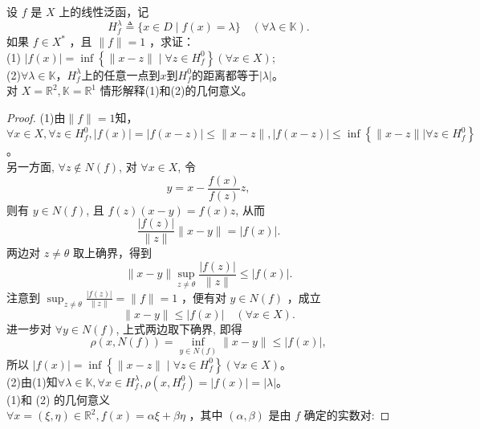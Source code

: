 \documentclass[lang=cn,newtx,10pt,scheme=chinese,thmcnt=chapter]{elegantbook}
\begin{document}
\begin{problem}
 设 $f$ 是 ${X}$ 上的线性泛函，记
\begin{equation*}
H_f^\lambda \triangleq\{x \in D \mid f(x)=\lambda\} \quad(\forall \lambda \in \mathbb{K} ) .
\end{equation*}
如果 $f \in {X}^*$ ，且 $\|f\|=1$ ，求证：\\
(1) $|f(x)|=\inf \left\{\|x-z\| \mid \forall z \in H_f^0\right\}(\forall x \in {X} )$;\\
(2)$\forall \lambda \in \mathbb{K}$，$H_f^\lambda$上的任意一点到$x$到$H_f^0$的距离都等于$|\lambda|$。\\
对 ${X} = \mathbb{R} ^2, \mathbb{K} = \mathbb{R} ^1$ 情形解释(1)和(2)的几何意义。
\end{problem}
\begin{proof}
    (1)由$\|f\|=1$知，$\forall x\in {X},\forall z\in H_f^0,|f(x)|=|f(x-z)|\leqslant \|x-z\|,|f(x-z)|\leqslant\inf \left\{\|x-z\| |\forall z \in H_f^0\right\}$。\\
另一方面, $\forall z \notin N(f)$, 对 $\forall x \in {X}$, 令
\begin{equation*}
	y=x-\frac{f(x)}{f(z)} z,
\end{equation*}
则有 $y \in N(f)$, 且 $f(z)(x-y)=f(x) z$, 从而
\begin{equation*}
	\frac{|f(z)|}{\|z\|}\|x-y\|=|f(x)| .
\end{equation*}
两边对 $z \neq \theta$ 取上确界，得到
\begin{equation*}
	\|x-y\| \sup _{z \neq \theta} \frac{|f(z)|}{\|z\|} \leqslant|f(x)| .
\end{equation*}
注意到 $\sup _{z \neq \theta} \frac{|f(z)|}{\|z\|}=\|f\|=1$ ，便有对 $y \in N(f)$ ，成立
\begin{equation*}
	\|x-y\| \leqslant|f(x)| \quad(\forall x \in {X} ) .
\end{equation*}
进一步对 $\forall y \in N(f)$, 上式两边取下确界, 即得
\begin{equation*}
	\rho(x, N(f))=\inf _{y \in N(f)}\|x-y\| \leqslant|f(x)|,
\end{equation*}
所以 $|f(x)|=\inf \left\{\|x-z\| \mid \forall z \in H_f^0\right\}(\forall x \in {X} )$。\\
(2)由(1)知$\forall\lambda \in \mathbb{K},\forall x\in H_f^\lambda,\rho(x,H_f^0)=|f(x)|=|\lambda|$。\\
(1)和 (2) 的几何意义\\
$\forall x=(\xi, \eta) \in \mathbb{R} ^2, f(x)=\alpha \xi+\beta \eta$ ，其中 $(\alpha, \beta)$ 是由 $f$ 确定的实数对:

\end{proof}
\end{document}
